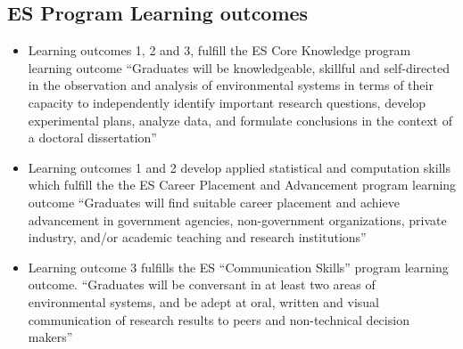 \documentclass{article}
\begin{document}
\subsection*{ES Program Learning outcomes}
\begin{itemize}
 \item Learning outcomes 1, 2 and 3, fulfill the ES Core Knowledge program learning outcome ``Graduates will be knowledgeable, skillful and self-directed in the observation and analysis of environmental systems in terms of their capacity to independently identify important research questions, develop experimental plans, analyze data, and formulate conclusions in the context of a doctoral dissertation''
 \item Learning outcomes 1 and 2 develop applied statistical and computation skills which fulfill the the ES Career Placement and Advancement program learning outcome ``Graduates will find suitable career placement and achieve advancement in government agencies, non-government organizations, private industry, and/or academic teaching and research institutions''
 \item Learning outcome 3 fulfills the ES ``Communication Skills'' program learning outcome. ``Graduates will be conversant in at least two areas of environmental systems, and be adept at oral, written and visual communication of research results to peers and non-technical decision makers''
\end{itemize}
\end{document}
